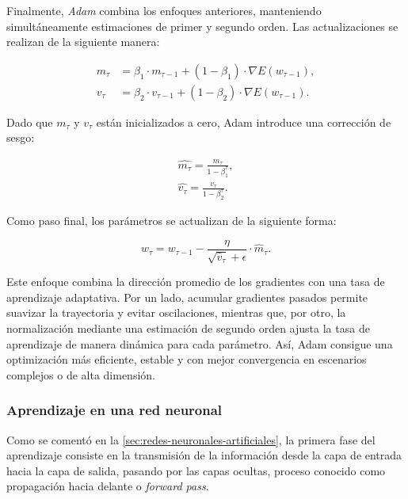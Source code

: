 Finalmente, \textit{Adam} combina los enfoques anteriores, manteniendo simultáneamente estimaciones de primer y segundo orden. Las actualizaciones se realizan de la siguiente manera:

\begin{equation}
    \begin{aligned}
        m_{\tau} &= \beta_1 \cdot m_{\tau-1} + (1 - \beta_1) \cdot \nabla E(w_{\tau - 1}), \\
        v_{\tau} &= \beta_2 \cdot v_{\tau-1} + (1 - \beta_2) \cdot \nabla E(w_{\tau - 1}).
    \end{aligned}
\end{equation}

Dado que $m_\tau$ y $v_\tau$ están inicializados a cero, Adam introduce una corrección de sesgo:

\begin{equation}
    \begin{aligned}
        \hat{m_\tau} = \frac{m_\tau}{1- \beta_1^{\tau}}, \\
        \hat{v_\tau} = \frac{v_\tau}{1- \beta_2^{\tau}}.
    \end{aligned}
\end{equation}

Como paso final, los parámetros se actualizan de la siguiente forma:

\begin{equation}
    w_{\tau} = w_{\tau - 1} - \frac{\eta}{\sqrt{\hat{v}_{\tau}} + \epsilon} \cdot \hat{m}_{\tau}.
\end{equation}

Este enfoque combina la dirección promedio de los gradientes con una tasa de aprendizaje adaptativa. Por un lado, acumular gradientes pasados permite suavizar la trayectoria y evitar oscilaciones, mientras que, por otro, la normalización mediante una estimación de segundo orden ajusta la tasa de aprendizaje de manera dinámica para cada parámetro. Así, Adam consigue una optimización más eficiente, estable y con mejor convergencia en escenarios complejos o de alta dimensión.

\subsubsection{Aprendizaje en una red neuronal}\label{subsubsec:aprendizaje-red-neuronal}

Como se comentó en la \autoref{sec:redes-neuronales-artificiales}, la primera fase del aprendizaje consiste en la transmisión de la información desde la capa de entrada hacia la capa de salida, pasando por las capas ocultas, proceso conocido como propagación hacia delante o \emph{forward pass}. 

